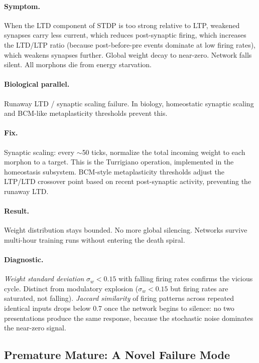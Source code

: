 \paragraph{Symptom.}
When the LTD component of STDP is too strong relative to LTP, weakened synapses carry less current, which reduces post-synaptic firing, which increases the LTD/LTP ratio (because post-before-pre events dominate at low firing rates), which weakens synapses further. Global weight decay to near-zero. Network falls silent. All morphons die from energy starvation.

\paragraph{Biological parallel.}
Runaway LTD / synaptic scaling failure. In biology, homeostatic synaptic scaling \cite{turrigiano2008homeostatic} and BCM-like metaplasticity thresholds \cite{bienenstock1982bcm} prevent this.

\paragraph{Fix.}
Synaptic scaling: every $\sim$50 ticks, normalize the total incoming weight to each morphon to a target. This is the Turrigiano operation, implemented in the homeostasis subsystem. BCM-style metaplasticity thresholds adjust the LTP/LTD crossover point based on recent post-synaptic activity, preventing the runaway LTD.

\paragraph{Result.}
Weight distribution stays bounded. No more global silencing. Networks survive multi-hour training runs without entering the death spiral.

\paragraph{Diagnostic.}
\emph{Weight standard deviation} $\sigma_w < 0.15$ with falling firing rates confirms the vicious cycle. Distinct from modulatory explosion ($\sigma_w < 0.15$ but firing rates are saturated, not falling). \emph{Jaccard similarity} of firing patterns across repeated identical inputs drops below 0.7 once the network begins to silence: no two presentations produce the same response, because the stochastic noise dominates the near-zero signal.

\subsection{Premature Mature: A Novel Failure Mode}
\label{sec:premature_mature}

